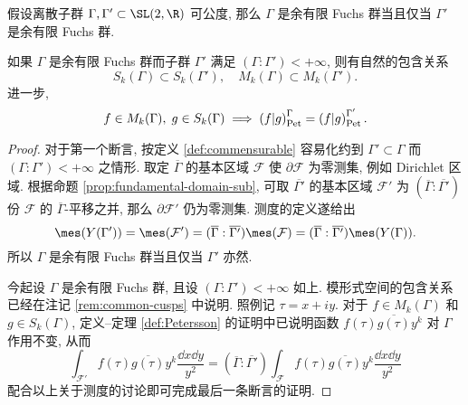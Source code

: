 \begin{proposition}\label{prop:Pet-indep}
	假设离散子群 $\Gamma, \Gamma' \subset \SL(2,\R)$ 可公度, 那么 $\Gamma$ 是余有限 Fuchs 群当且仅当 $\Gamma'$ 是余有限 Fuchs 群.
	
	如果 $\Gamma$ 是余有限 Fuchs 群而子群 $\Gamma'$ 满足 $(\Gamma : \Gamma') < +\infty$, 则有自然的包含关系
	\[ S_k(\Gamma) \subset S_k(\Gamma'), \quad M_k(\Gamma) \subset M_k(\Gamma'). \]
	进一步,
	\[ f \in M_k(\Gamma), \; g \in S_k(\Gamma) \implies  \left( f \middle| g \right)_{\mathrm{Pet}}^\Gamma =  \left( f \middle| g \right)_{\mathrm{Pet}}^{\Gamma'}. \]
\end{proposition}
\begin{proof}
	对于第一个断言, 按定义 \ref{def:commensurable} 容易化约到 $\Gamma' \subset \Gamma$ 而 $(\Gamma : \Gamma') < +\infty$ 之情形. 取定 $\overline{\Gamma}$ 的基本区域 $\mathcal{F}$ 使 $\partial \mathcal{F}$ 为零测集, 例如 Dirichlet 区域. 根据命题 \ref{prop:fundamental-domain-sub}, 可取 $\overline{\Gamma'}$ 的基本区域 $\mathcal{F}'$ 为 $(\overline{\Gamma} : \overline{\Gamma'})$ 份 $\mathcal{F}$ 的 $\overline{\Gamma}$-平移之并, 那么 $\partial \mathcal{F}'$ 仍为零测集. 测度的定义遂给出
	\[ \mes(Y(\Gamma')) = \mes(\mathcal{F}') = (\overline{\Gamma} : \overline{\Gamma'}) \mes(\mathcal{F}) = (\overline{\Gamma} : \overline{\Gamma'}) \mes(Y(\Gamma)). \]
	所以 $\Gamma$ 是余有限 Fuchs 群当且仅当 $\Gamma'$ 亦然.
	
	今起设 $\Gamma$ 是余有限 Fuchs 群, 且设 $(\Gamma : \Gamma') < +\infty$ 如上. 模形式空间的包含关系已经在注记 \ref{rem:common-cusps} 中说明. 照例记 $\tau = x + iy$. 对于 $f \in M_k(\Gamma)$ 和 $g \in S_k(\Gamma)$, 定义--定理 \ref{def:Petersson} 的证明中已说明函数 $f(\tau)\overline{g(\tau)}y^k$ 对 $\Gamma$ 作用不变, 从而
	\[ \int_{\mathcal{F}'} f(\tau) \overline{g(\tau)} y^k \dfrac{\dd x \dd y}{y^2} = (\overline{\Gamma} : \overline{\Gamma'}) \int_{\mathcal{F}} f(\tau) \overline{g(\tau)} y^k \dfrac{\dd x \dd y}{y^2} \]
	配合以上关于测度的讨论即可完成最后一条断言的证明.
\end{proof}

